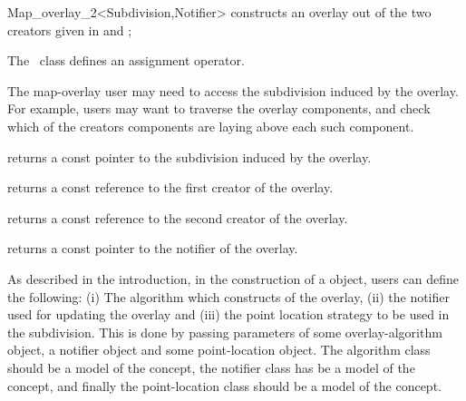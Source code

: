 \begin{ccRefClass}{Map_overlay_2<Subdivision,Notifier>}
  {constructs an overlay out of the two creators given in  and ;}
  

The \ccClassTemplateName\ class defines an assignment operator.



The map-overlay user may need to access the subdivision induced by the 
overlay. 
For example, users may want to traverse the overlay components, 
and check which of the creators components are laying above each 
such component.

{returns a const pointer to the subdivision induced by the overlay.}


{returns a const reference to the first creator of the overlay.}

{returns a const reference to the second creator of the overlay.}

{returns a const pointer to the notifier of the overlay.}

\begin{ccAdvanced}


As described in the introduction, in the construction of 
a  object, users can define 
the following:
(i) The algorithm which constructs of the overlay, 
(ii) the notifier used for updating the overlay and 
(iii) the point location strategy to be used in the subdivision. 
This is done by passing parameters of some overlay-algorithm object, 
a notifier object and some point-location object. 
The algorithm class should be a model of the 
 concept, the notifier class has be a model 
of the  concept, and finally the 
point-location class should be a model of the
 concept. 


\end{ccAdvanced}
\end{ccRefClass}
